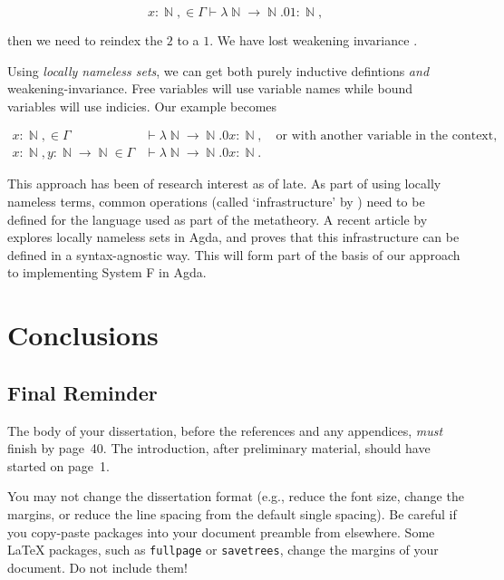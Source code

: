 \documentclass[logo,bsc,singlespacing,parskip,online]{infthesis}
\DeclareMathOperator{\nat}{\mathbb{N}}
\begin{document}
\begin{equation*}
  x \colon \nat, \in \Gamma \vdash \lambda \nat \to \nat. 0 1 \colon \nat,
\end{equation*}

then we need to reindex the $2$ to a $1$. We have lost weakening invariance
\citep{aydemir_engineering_2008}.

Using \textit{locally nameless sets}, we can get both purely inductive
defintions \textit{and} weakening-invariance. Free variables will use variable
names while bound variables will use indicies. Our example becomes

\begin{align*}
  x \colon \nat, \in \Gamma &\vdash \lambda \nat \to \nat. 0 x \colon \nat,\quad \text{or with another variable in the context,}\\
  x \colon \nat, y \colon \nat \to \nat \in \Gamma &\vdash \lambda \nat \to \nat. 0 x \colon \nat.
\end{align*}

This approach has been of research interest as of late. As part of using locally
nameless terms, common operations (called `infrastructure' by
\citet{aydemir_engineering_2008}) need to be defined for the language used as
part of the metatheory. A recent article by \citet{pitts_locally_2023} explores
locally nameless sets in Agda, and proves that this infrastructure can be
defined in a syntax-agnostic way. This will form part of the basis of our
approach to implementing System F in Agda.

\chapter{Conclusions}

\section{Final Reminder}

The body of your dissertation, before the references and any appendices,
\emph{must} finish by page~40. The introduction, after preliminary material,
should have started on page~1.

You may not change the dissertation format (e.g., reduce the font size, change
the margins, or reduce the line spacing from the default single spacing). Be
careful if you copy-paste packages into your document preamble from elsewhere.
Some \LaTeX{} packages, such as \texttt{fullpage} or \texttt{savetrees}, change
the margins of your document. Do not include them!
\end{document}
